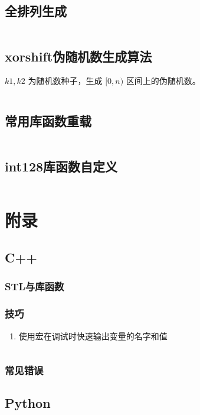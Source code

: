 \documentclass[a4paper, twoside]{article}
\begin{document}
\subsection{全排列生成}
\inputminted{cpp}{../src/杂项/全排列生成.cpp}

\subsection{xorshift伪随机数生成算法}
$k1, k2$ 为随机数种子，生成 $[0, n)$ 区间上的伪随机数。
\inputminted{cpp}{../src/杂项/xorshift伪随机数生成算法.cpp}

\subsection{常用库函数重载}
\inputminted{cpp}{../src/杂项/常用库函数重载.cpp}

\subsection{int128库函数自定义}
\inputminted{cpp}{../src/杂项/int128库函数自定义.cpp}

\newpage
\section{附录}
\subsection{C++}
    \subsubsection{STL与库函数}

    \subsubsection{技巧}
    \begin{enumerate}
        \item 使用宏在调试时快速输出变量的名字和值
        \inputminted{cpp}{../src/附录/C++/debug宏.cpp}
    \end{enumerate}
    
    \subsubsection{常见错误}

\subsection{Python}
\end{document}
